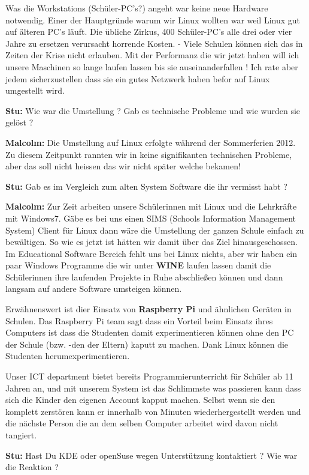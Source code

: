 \documentclass[10pt,a4paper,ngerman,twoside]{article} %
\begin{document}
\begin{multicols}{3}
Was die Workstations (Schüler-PC's?) angeht war keine neue Hardware notwendig. Einer der Hauptgründe warum wir Linux wollten war weil Linux gut auf älteren PC's läuft. Die übliche Zirkus, 400 Schüler-PC's alle drei oder vier Jahre zu ersetzen verursacht horrende Kosten.
-
Viele Schulen können sich das in Zeiten der Krise nicht erlauben. Mit der Performanz die wir jetzt haben will ich unsere Maschinen so lange laufen lassen bis sie auseinanderfallen ! Ich rate aber jedem sicherzustellen dass sie ein gutes Netzwerk haben befor auf Linux umgestellt wird.

\textbf{Stu:} Wie war die Umstellung ? Gab es technische Probleme und wie wurden sie gelöst ?

\textbf{Malcolm:} Die Umstellung auf Linux erfolgte während der Sommerferien 2012. Zu diesem Zeitpunkt rannten wir in keine signifikanten technischen Probleme, aber das soll nicht heissen das wir nicht später welche bekamen!

\textbf{Stu:} Gab es im Vergleich zum alten System Software die ihr vermisst habt ?

\textbf{Malcolm:} Zur Zeit arbeiten unsere Schülerinnen mit Linux und die Lehrkräfte mit Windows7. Gäbe es bei uns einen SIMS (Schools Information Management System) Client für Linux dann wäre die Umstellung der ganzen Schule einfach zu bewältigen. So wie es jetzt ist hätten wir damit über das Ziel hinausgeschossen. Im Educational Software Bereich fehlt uns bei Linux nichts, aber wir haben ein paar Windows Programme die wir unter \textbf{WINE} laufen lassen damit die Schülerinnen ihre laufenden Projekte in Ruhe abschließen können und dann langsam auf andere Software umsteigen können.

Erwähnenswert ist dier Einsatz von \textbf{Raspberry Pi} und ähnlichen Geräten in Schulen. Das Raspberry Pi team sagt dass ein Vorteil beim Einsatz ihres Computers ist dass die Studenten damit experimentieren können ohne den PC der Schule (bzw. -den der Eltern) kaputt zu machen. Dank Linux können die Studenten herumexperimentieren. 

Unser ICT department bietet bereits Programmierunterricht für Schüler ab 11 Jahren an, und mit unserem System ist das Schlimmste was passieren kann dass sich die Kinder den eigenen Account kapput machen. Selbst wenn sie den komplett zerstören kann er innerhalb von Minuten wiederhergestellt werden und die nächste Person die an dem selben Computer arbeitet wird davon nicht tangiert. 

\textbf{Stu:} Hast Du KDE oder openSuse wegen Unterstützung kontaktiert ? Wie war die Reaktion ? 



\end{multicols}
\end{document}

